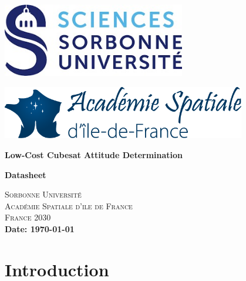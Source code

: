 \documentclass[a4paper, 12pt]{article}
\begin{document}
\begin{titlepage}
    \vspace*{\fill}  %
    \centering

    \begin{minipage}{0.45\textwidth}
        \centering
        \includegraphics[width=0.6\textwidth]{fig/SU.jpg}
    \end{minipage}%
    \hfill
    \begin{minipage}{0.45\textwidth}
        \centering
        \includegraphics[width=0.8\textwidth]{fig/Academie_Spatiale.png}
    \end{minipage}

    \vspace{5cm}

    {\bfseries\Huge Low-Cost Cubesat Attitude Determination\par}
\vspace{0.9cm}
{\bfseries\Huge Datasheet\par}
        \vspace{3cm}
    \textsc{\LARGE Sorbonne Université}\\[1cm]
    \textsc{\Large Académie Spatiale d'ile de France }\\[1cm]
    \textsc{\Large France 2030 }\\[1cm]
    \vspace{3cm}
    \textbf{Date: \today}

    \vspace*{\fill}  %
\end{titlepage}

\newpage
\tableofcontents
\newpage
\listoffigures
\newpage

\section{Introduction}
\end{document}
